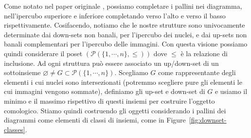 \documentclass[a4paper]{article}
\begin{document}
Come notato nel paper originale \cite{bergman2012diagramchasing}, possiamo completare i pallini nei diagramma,
nell'ipercubo superiore e inferiore completando verso l'alto e verso il basso rispettivamente.
Cosifacendo, notiamo che le nostre strutture sono univocamente determinate
dai down-sets non banali, per l'ipercubo dei nuclei, e dai up-sets non banali complementari per l'ipercubo delle immagini.
Con questa visione possiamo quindi considerare il poset \((\mathcal P(\{1, \cdots, n\}, \leq))\) dove
\(\leq\) è la relazione di inclusione. Ad ogni struttura può essere associato un
up/down-set di un sottoinsieme \(\varnothing \neq G \subset \mathcal P(\{1, \cdots, n\})\).
Scegliamo \(G\) come rappresentante degli elementi i cui nuclei sono intersezionati (potremmo scegliere
pure gli elementi le cui immagini vengono sommate), definiamo gli up-set e down-set di \(G\) e
usiamo il minimo e il massimo rispettivo di questi insiemi per costruire l'oggetto comologico.
Stiamo quindi costruendo gli oggetti considerando i pallini dei diagrammi come elementi
di classi di insiemi, come in Figure~\ref{fig:downset-classes}.
\begin{center}
\label{fig:downset-classes}
\end{center}
\end{document}
